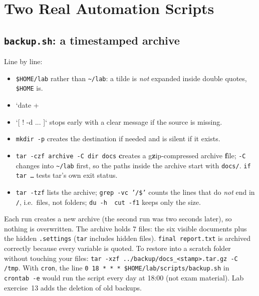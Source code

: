 \documentclass[11pt,a4paper]{article}
\newcommand{\cmd}[1]{\texttt{#1}}
\begin{document}
\section{Two Real Automation Scripts}

\subsection{\texttt{backup.sh}: a timestamped archive}



Line by line:
\begin{itemize}
  \item \texttt{\$HOME/lab} rather than \texttt{\textasciitilde/lab}: a tilde is \emph{not} expanded inside double quotes, \texttt{\$HOME} is.
  \item `date +%
  \item `[ ! -d ... ]` stops early with a clear message if the source is missing.
  \item \cmd{mkdir -p} creates the destination if needed and is silent if it exists.
  \item \cmd{tar -czf archive -C dir docs} \textbf{c}reates a g\textbf{z}ip-compressed archive \textbf{f}ile; \texttt{-C} changes into \texttt{\textasciitilde/lab} first, so the paths inside the archive start with \texttt{docs/}. \texttt{if tar \ldots} tests tar's own exit status.
  \item \cmd{tar -tzf} lists the archive; \cmd{grep -vc '/\$'} counts the lines that do \emph{not} end in \texttt{/}, i.e.\ files, not folders; \cmd{du -h \textbar\ cut -f1} keeps only the size.
\end{itemize}



Each run creates a new archive (the second run was two seconds later), so nothing is overwritten. The archive holds $7$ files: the six visible documents plus the hidden \texttt{.settings} (\cmd{tar} includes hidden files). \texttt{final report.txt} is archived correctly because every variable is quoted. To restore into a scratch folder without touching your files: \cmd{tar -xzf ../backup/docs\_<stamp>.tar.gz -C /tmp}. With \cmd{cron}, the line \texttt{0 18 * * * \$HOME/lab/scripts/backup.sh} in \cmd{crontab -e} would run the script every day at 18:00 (not exam material). Lab exercise~13 adds the deletion of old backups.
\end{document}
